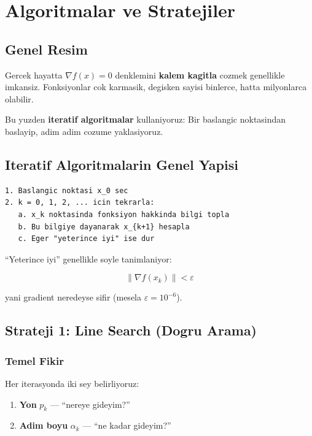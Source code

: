 \documentclass[12pt,a4paper]{article}
\theoremstyle{definition}
\theoremstyle{remark}
\begin{document}
\newpage
\section{Algoritmalar ve Stratejiler}

\subsection{Genel Resim}

Gercek hayatta $\nabla f(x) = 0$ denklemini \textbf{kalem kagitla} cozmek genellikle imkansiz. Fonksiyonlar cok karmasik, degisken sayisi binlerce, hatta milyonlarca olabilir.

Bu yuzden \textbf{iteratif algoritmalar} kullaniyoruz: Bir baslangic noktasindan baslayip, adim adim cozume yaklasiyoruz.

\subsection{Iteratif Algoritmalarin Genel Yapisi}

\begin{Verbatim}[frame=single, fontsize=\small]
1. Baslangic noktasi x_0 sec
2. k = 0, 1, 2, ... icin tekrarla:
   a. x_k noktasinda fonksiyon hakkinda bilgi topla
   b. Bu bilgiye dayanarak x_{k+1} hesapla
   c. Eger "yeterince iyi" ise dur
\end{Verbatim}

``Yeterince iyi'' genellikle soyle tanimlaniyor:

\[
\|\nabla f(x_k)\| < \varepsilon
\]

yani gradient neredeyse sifir (mesela $\varepsilon = 10^{-6}$).

\subsection{Strateji 1: Line Search (Dogru Arama)}

\subsubsection{Temel Fikir}

Her iterasyonda iki sey belirliyoruz:
\begin{enumerate}[leftmargin=*, itemsep=0.2em]
\item \textbf{Yon} $p_k$ --- ``nereye gideyim?''
\item \textbf{Adim boyu} $\alpha_k$ --- ``ne kadar gideyim?''
\end{enumerate}
\end{document}
